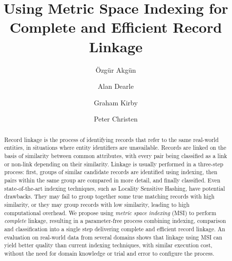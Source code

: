 \documentclass{llncs}
\begin{document}
       
\title{Using Metric Space Indexing for Complete and Efficient Record Linkage}


\author{{\"O}zg{\"u}r Akg{\"u}n \and Alan Dearle
  \and Graham Kirby \and Peter Christen}

      

\maketitle

\begin{abstract}

Record linkage is the process of identifying records that refer to the
same real-world entities, in situations where entity identifiers are
unavailable. Records are linked on the basis of similarity between
common attributes, with every pair being classified as a link or
non-link depending on their similarity. Linkage is usually performed in
a three-step process: first, groups of similar candidate records are
identified using indexing, then pairs within the same group are compared
in more detail, and finally classified. Even state-of-the-art indexing
techniques, such as Locality Sensitive Hashing, have potential
drawbacks. They may fail to group together some true matching records
with high similarity, or they may group records with low similarity,
leading to high computational overhead. We propose using \emph{metric
space indexing} (MSI) to perform \emph{complete} linkage, resulting in a
parameter-free process combining indexing, comparison and classification
into a single step delivering complete and efficient record linkage. An
evaluation on real-world data from several domains shows that linkage
using MSI can yield better quality than current indexing techniques,
with similar execution cost, without the need for domain knowledge or
trial and error to configure the process.

\end{abstract}
\end{document}
